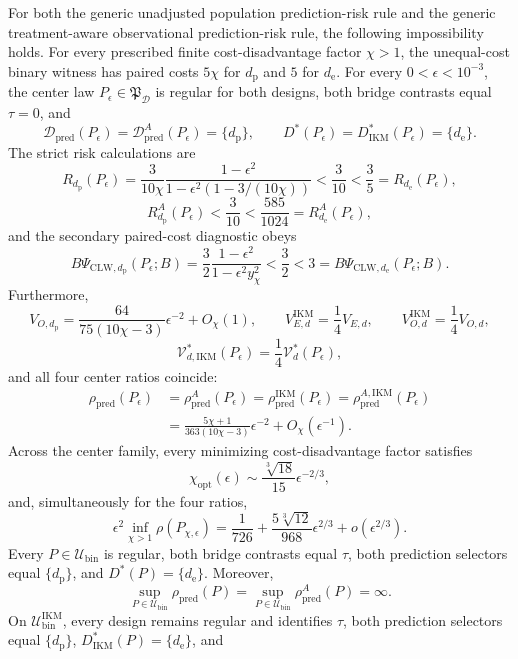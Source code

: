 For both the generic unadjusted population prediction-risk rule and the generic treatment-aware observational prediction-risk rule, the following impossibility holds.  For every prescribed finite cost-disadvantage factor \(\chi>1\), the unequal-cost binary witness has paired costs \(5\chi\) for \(d_{\mathrm p}\) and \(5\) for \(d_{\mathrm e}\).  For every \(0<\epsilon<10^{-3}\), the center law \(P_\epsilon\in\mathfrak P_{\mathcal D}\) is regular for both designs, both bridge contrasts equal \(\tau=0\), and
\[
 \mathcal D_{\mathrm{pred}}(P_\epsilon)
 =\mathcal D_{\mathrm{pred}}^A(P_\epsilon)=\{d_{\mathrm p}\},
 \qquad D^*(P_\epsilon)=D_{\mathrm{IKM}}^*(P_\epsilon)=\{d_{\mathrm e}\}.
\]
The strict risk calculations are
\[
 R_{d_{\mathrm p}}(P_\epsilon)
 =\frac{3}{10\chi}\frac{1-\epsilon^2}{1-\epsilon^2(1-3/(10\chi))}
 <\frac3{10}<\frac35=R_{d_{\mathrm e}}(P_\epsilon),
\]
\[
 R_{d_{\mathrm p}}^A(P_\epsilon)<\frac3{10}
 <\frac{585}{1024}=R_{d_{\mathrm e}}^A(P_\epsilon),
\]
and the secondary paired-cost diagnostic obeys
\[
 B\Psi_{\mathrm{CLW},d_{\mathrm p}}(P_\epsilon;B)
 =\frac32\frac{1-\epsilon^2}{1-\epsilon^2y_\chi^2}
 <\frac32<3=B\Psi_{\mathrm{CLW},d_{\mathrm e}}(P_\epsilon;B).
\]
Furthermore,
\[
 V_{O,d_{\mathrm p}}
 =\frac{64}{75(10\chi-3)}\epsilon^{-2}+O_\chi(1),
 \qquad
 V_{E,d}^{\mathrm{IKM}}=\frac14V_{E,d},
 \qquad V_{O,d}^{\mathrm{IKM}}=\frac14V_{O,d},
\]
\[
 \mathcal V_{d,\mathrm{IKM}}^*(P_\epsilon)=\frac14\mathcal V_d^*(P_\epsilon),
\]
and all four center ratios coincide:
\[
\begin{aligned}
 \rho_{\mathrm{pred}}(P_\epsilon)
 &=\rho_{\mathrm{pred}}^A(P_\epsilon)
 =\rho_{\mathrm{pred}}^{\mathrm{IKM}}(P_\epsilon)
 =\rho_{\mathrm{pred}}^{A,\mathrm{IKM}}(P_\epsilon)\\
 &=\frac{5\chi+1}{363(10\chi-3)}\epsilon^{-2}+O_\chi(\epsilon^{-1}).
\end{aligned}
\]
Across the center family, every minimizing cost-disadvantage factor satisfies
\[
 \chi_{\mathrm{opt}}(\epsilon)
 \sim\frac{\sqrt[3]{18}}{15}\epsilon^{-2/3},
\]
and, simultaneously for the four ratios,
\[
 \epsilon^2\inf_{\chi>1}\rho(P_{\chi,\epsilon})
 =\frac1{726}+\frac{5\sqrt[3]{12}}{968}\epsilon^{2/3}+o(\epsilon^{2/3}).       \tag{1}
\]
Every \(P\in\mathcal U_{\mathrm{bin}}\) is regular, both bridge contrasts equal \(\tau\), both prediction selectors equal \(\{d_{\mathrm p}\}\), and \(D^*(P)=\{d_{\mathrm e}\}\).  Moreover,
\[
 \sup_{P\in\mathcal U_{\mathrm{bin}}}\rho_{\mathrm{pred}}(P)
 =\sup_{P\in\mathcal U_{\mathrm{bin}}}\rho_{\mathrm{pred}}^A(P)=\infty.
\]
On \(\mathcal U_{\mathrm{bin}}^{\mathrm{IKM}}\), every design remains regular and identifies \(\tau\), both prediction selectors equal \(\{d_{\mathrm p}\}\), \(D_{\mathrm{IKM}}^*(P)=\{d_{\mathrm e}\}\), and
